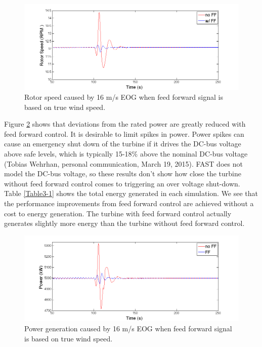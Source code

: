 \begin{figure}[htb]
	\centering
		\includegraphics[width = \linewidth]{Figures/ch3Figures/fig3-14.png}
	\caption{Rotor speed caused by 16 m/s EOG when feed forward signal is based on true wind speed.}
	\label{fig3-14}
\end{figure}

Figure \ref{fig3-15} shows that deviations from the rated power are greatly reduced with feed forward control. It is desirable to limit spikes in power. Power spikes can cause an emergency shut down of the turbine if it drives the DC-bus voltage above safe levels, which is typically 15-18$\%$ above the nominal DC-bus voltage (Tobias Wehrhan, personal communication, March 19, 2015). FAST does not model the DC-bus voltage, so these results don't show how close the turbine without feed forward control comes to triggering an over voltage shut-down. Table \ref{Table3-1} shows the total energy generated in each simulation. We see that the performance improvements from feed forward control are achieved without a cost to energy generation. The turbine with feed forward control actually generates slightly more energy than the turbine without feed forward control.


\begin{figure}[htb]
	\centering
		\includegraphics[width = \linewidth]{Figures/ch3Figures/fig3-15.png}
	\caption{Power generation caused by 16 m/s EOG when feed forward signal is based on true wind speed.}
	\label{fig3-15}
\end{figure}

